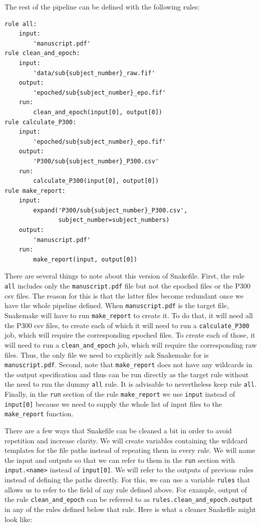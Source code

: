 \documentclass[a4paper,man,floatsintext,natbib]{apa6}
\begin{document}
The rest of the pipeline can be defined with the following rules:

\begin{verbatim}
rule all:
    input:
        'manuscript.pdf'
rule clean_and_epoch:
    input:
        'data/sub{subject_number}_raw.fif'
    output:
        'epoched/sub{subject_number}_epo.fif'
    run:
        clean_and_epoch(input[0], output[0])
rule calculate_P300:
    input:
        'epoched/sub{subject_number}_epo.fif'
    output:
        'P300/sub{subject_number}_P300.csv'
    run:
        calculate_P300(input[0], output[0])
rule make_report:
    input:
        expand('P300/sub{subject_number}_P300.csv',
               subject_number=subject_numbers)   
    output:
        'manuscript.pdf'
    run:
        make_report(input, output[0])
\end{verbatim}

There are several things to note about this version of Snakefile. First, the rule \verb|all| includes only the \verb|manuscript.pdf| file but not the epoched files or the P300 csv files. The reason for this is that the latter files become redundant once we have the whole pipeline defined. When \verb|manuscript.pdf| is the target file, Snakemake will have to run \verb|make_report| to create it. To do that, it will need all the P300 csv files, to create each of which it will need to run a \verb|calculate_P300| job, which will require the corresponding epoched files. To create each of those, it will need to run a \verb|clean_and_epoch| job, which will require the corresponding raw files. Thus, the only file we need to explicitly ask Snakemake for is \verb|manuscript.pdf|. Second, note that \verb|make_report| does not have any wildcards in the output specification and thus can be run directly as the target rule without the need to run the dummy \verb|all| rule. It is advisable to nevertheless keep rule \verb|all|. Finally, in the \verb|run| section of the rule \verb|make_report| we use \verb|input| instead of \verb|input[0]| because we need to supply the whole list of input files to the \verb|make_report| function.

There are a few ways that Snakefile can be cleaned a bit in order to avoid repetition and increase clarity. We will create variables containing the wildcard templates for the file paths instead of repeating them in every rule. We will name the input and outputs so that we can refer to them in the \verb|run| section with \verb|input.<name>| instead of \verb|input[0]|. We will refer to the outputs of previous rules instead of defining the paths directly. For this, we can use a variable \verb|rules| that allows us to refer to the field of any rule defined above. For example, output of the rule \verb|clean_and_epoch| can be referred to as \verb|rules.clean_and_epoch.output| in any of the rules defined below that rule. Here is what a cleaner Snakefile might look like:
\end{document}
